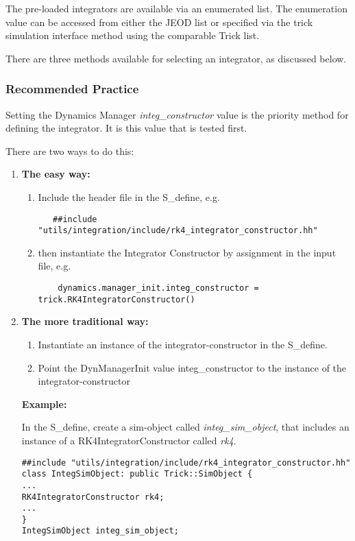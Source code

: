 The pre-loaded integrators are available via an enumerated list.  The 
enumeration value can be accessed from either the JEOD list or specified via 
the trick simulation interface method using the comparable 
Trick list.

There are three methods available for selecting an integrator, as discussed 
below.

\subsubsection {Recommended Practice}

Setting the Dynamics Manager \textit{integ\_constructor} value is the priority 
method for defining the integrator.  It is this value that is tested first.

There are two ways to do this:
\begin{enumerate}
 \item \textbf{The easy way:} \newline
 \begin{enumerate}
  \item Include the header file in the S\_define, e.g.
   \begin{verbatim}
   ##include "utils/integration/include/rk4_integrator_constructor.hh"
   \end{verbatim}
   \item then instantiate the Integrator Constructor by assignment in the   
     input file, e.g.
   \begin{verbatim}
    dynamics.manager_init.integ_constructor = trick.RK4IntegratorConstructor()
   \end{verbatim}
 \end{enumerate}



 \item \textbf{The more traditional way:} \newline
 \begin{enumerate}
  \item Instantiate an instance of the integrator-constructor in the S\_define.
  \item Point the DynManagerInit value integ\_constructor to the instance of 
  the integrator-constructor 
 \end{enumerate}
 
\textbf{Example:}

In the S\_define, create a sim-object called \textit{integ\_sim\_object}, that 
includes an instance of a RK4IntegratorConstructor called \textit{rk4}.
\begin{verbatim}
##include "utils/integration/include/rk4_integrator_constructor.hh"
class IntegSimObject: public Trick::SimObject {
...
RK4IntegratorConstructor rk4;
...
}
IntegSimObject integ_sim_object;
\end{verbatim}


\end{enumerate}
